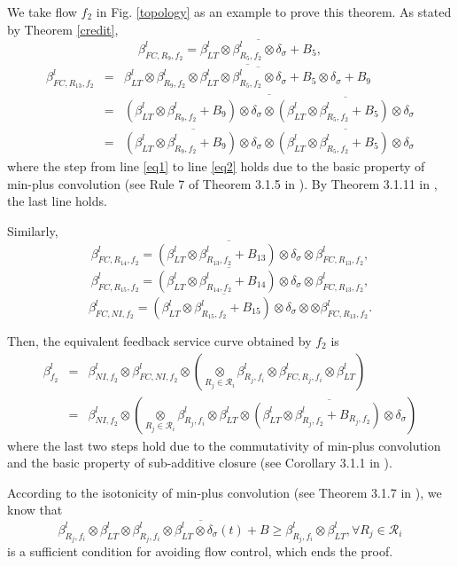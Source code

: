 \documentclass[10pt,journal]{IEEEtran}
\begin{document}
\begin{IEEEproof}
We take flow $f_2$ in Fig. \ref{topology} as an example to prove this theorem. As stated by Theorem \ref{credit}, $$\beta_{FC,R_9,f_2}^l=\overline{\beta^l_{LT}\otimes\beta_{R_5,f_2}^l\otimes\delta_\sigma+B_5},$$
\begin{eqnarray}
\beta_{FC,R_{13},f_2}^l&=&\overline{\beta^l_{LT}\otimes\beta^l_{R_9,f_2}\otimes\overline{\beta^l_{LT}\otimes\beta^l_{R_5,f_2}\otimes\delta_\sigma+B_5}\otimes\delta_\sigma+B_9}\label{eq1}\\
&=&\overline{(\beta^l_{LT}\otimes\beta^l_{R_9,f_2}+B_9)\otimes\delta_\sigma\otimes\overline{(\beta^l_{LT}\otimes\beta^l_{R_5,f_2}+B_5)\otimes\delta_\sigma}}\label{eq2}\\
&=&\overline{(\beta^l_{LT}\otimes\beta^l_{R_9,f_2}+B_9)\otimes\delta_\sigma}\otimes\overline{(\beta^l_{LT}\otimes\beta^l_{R_5,f_2}+B_5)\otimes\delta_\sigma}\label{eq3}
\end{eqnarray}
where the step from line \ref{eq1} to line \ref{eq2} holds due to the basic property of min-plus convolution (see Rule 7 of Theorem 3.1.5 in \cite{Boudec2001Network}). By Theorem 3.1.11 in \cite{Boudec2001Network}, the last line holds.

Similarly, $$\beta_{FC,R_{14},f_2}^l=\overline{(\beta^l_{LT}\otimes\beta^l_{R_{13},f_2}+B_{13})\otimes\delta_\sigma}\otimes\beta_{FC,R_{13},f_2}^l,$$
$$\beta_{FC,R_{15},f_2}^l=\overline{(\beta^l_{LT}\otimes\beta^l_{R_{14},f_2}+B_{14})\otimes\delta_\sigma}\otimes\beta_{FC,R_{13},f_2}^l,$$
$$\beta_{FC,NI,f_2}^l=\overline{(\beta^l_{LT}\otimes\beta^l_{R_{15},f_2}+B_{15})\otimes\delta_\sigma}\otimes\otimes\beta_{FC,R_{13},f_2}^l.$$

Then, the equivalent feedback service curve obtained by $f_2$ is
\begin{eqnarray}
\beta_{f_2}^l&=&\beta_{NI,f_2}^l\otimes\beta_{FC,NI,f_2}^l\otimes(\underset{R_j\in\mathcal{R}_i}{\otimes}\beta^l_{R_j,f_i}\otimes\beta^l_{FC,R_j,f_i}\otimes\beta_{LT}^l)\\
&=& \beta_{NI,f_2}^l\otimes(\underset{R_j\in\mathcal{R}_i}{\otimes}\beta^l_{R_j,f_i}\otimes\beta_{LT}^l\otimes\overline{(\beta^l_{LT}\otimes\beta^l_{R_{j},f_2}+B_{R_j,f_2})\otimes\delta_\sigma})
\end{eqnarray}
where the last two steps hold due to the commutativity of min-plus convolution and the basic property of sub-additive closure (see Corollary 3.1.1 in \cite{Boudec2001Network}).

According to the isotonicity of min-plus convolution (see Theorem 3.1.7 in \cite{Boudec2001Network}), we know that $$\beta_{R_j,f_i}^l\otimes\beta_{LT}^l\otimes\overline{\beta_{R_j,f_i}^l\otimes\beta_{LT}^l\otimes\delta_\sigma(t)+B}\geq\beta_{R_j,f_i}^l\otimes\beta_{LT}^l,\forall R_j\in\mathcal{R}_i$$ is a sufficient condition for avoiding flow control, which ends the proof.
\end{IEEEproof}
\end{document}

